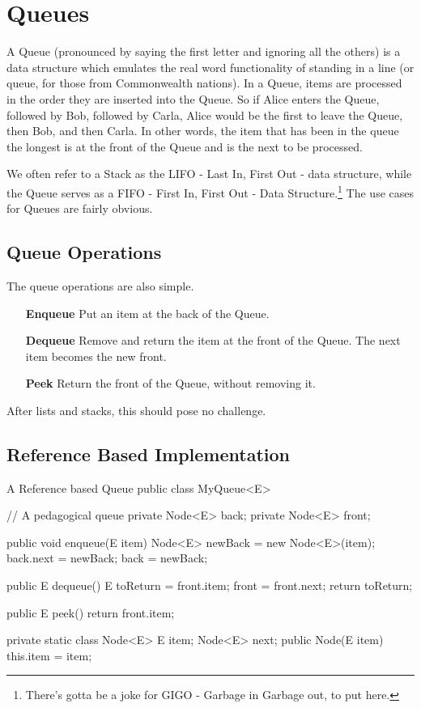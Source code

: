
\chapter{Queues}
\label{chap-queue}

A Queue (pronounced by saying the first letter and ignoring all the others) is a data structure which emulates the real word functionality of standing in a line (or queue, for those from Commonwealth nations).  
In a Queue, items are processed in the order they are inserted into the Queue.  So if Alice enters the Queue, followed by Bob, followed by Carla, Alice would be the first to leave the Queue, then Bob, and then Carla.
In other words, the item that has been in the queue the longest is at the front of the Queue and is the next to be processed.


We often refer to a Stack as the LIFO - Last In, First Out - data structure, while the Queue serves as a FIFO - First In, First Out - Data Structure.\footnote{There's gotta be a joke for GIGO - Garbage in Garbage out, to put here.}
The use cases for Queues are fairly obvious.

\section{Queue Operations}
The queue operations are also simple. 

\begin{enumerate}
	\item[\textbf{Enqueue}] Put an item at the back of the Queue.
	\item[\textbf{Dequeue}] Remove and return the item at the front of the Queue.  The next item becomes the new front.
	\item[\textbf{Peek}] Return the front of the Queue, without removing it.
\end{enumerate}


After lists and stacks, this should pose no challenge.
\section{Reference Based Implementation} 

\begin{javacode}{A Reference based Queue}
public class MyQueue<E> {
	// A pedagogical queue
	private Node<E> back;
	private Node<E> front;
	
	public void enqueue(E item){
		Node<E> newBack =  new Node<E>(item);
		back.next = newBack;
		back =  newBack;
	}
	
	public E dequeue() {
		E toReturn =  front.item;
		front = front.next;
		return toReturn;
	}
	
	public E peek() {
		return front.item;
	}
	
	private static class Node<E>{
		E item;
		Node<E> next;
		public Node(E item) {
			this.item = item;
		}
	}
}

\end{javacode}



